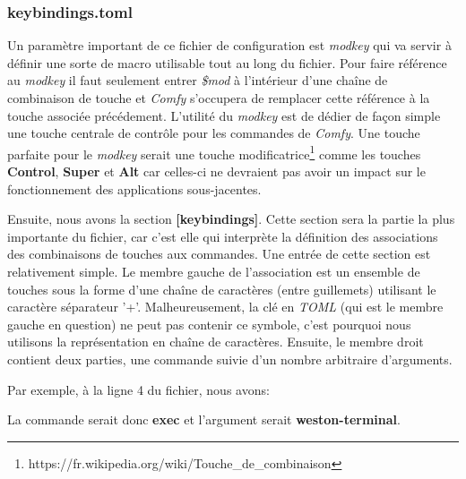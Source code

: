 \documentclass[titlepage]{article}
\begin{document}
\subsubsection{keybindings.toml}
\begin{minipage}{\linewidth}
	
\end{minipage}
\bigskip

\par
Un paramètre important de ce fichier de configuration est \textit{modkey} qui va
servir à définir une sorte de macro utilisable tout au long du fichier. Pour
faire référence au \textit{modkey} il faut seulement entrer \textit{\$mod} à
l'intérieur d'une chaîne de combinaison de touche et \textit{Comfy} s'occupera
de remplacer cette référence à la touche associée précédement. L'utilité du
\textit{modkey} est de dédier de façon simple une touche centrale de contrôle
pour les commandes de \textit{Comfy}. Une touche parfaite pour le
\textit{modkey} serait une touche
modificatrice\footnote{https://fr.wikipedia.org/wiki/Touche\_de\_combinaison}
comme les touches \textbf{Control}, \textbf{Super} et \textbf{Alt} car celles-ci
ne devraient pas avoir un impact sur le fonctionnement des applications
sous-jacentes.
\bigskip

\par
Ensuite, nous avons la section \textbf{[keybindings]}. Cette section sera la
partie la plus importante du fichier, car c'est elle qui interprète la définition
des associations des combinaisons de touches aux commandes. Une entrée de cette
section est relativement simple. Le membre gauche de l'association est un
ensemble de touches sous la forme d'une chaîne de caractères (entre guillemets)
utilisant le caractère séparateur '+'. Malheureusement, la clé en \textit{TOML}
(qui est le membre gauche en question) ne peut pas contenir ce symbole, c'est
pourquoi nous utilisons la représentation en chaîne de caractères. Ensuite, le
membre droit contient deux parties, une commande suivie d'un nombre arbitraire
d'arguments.
\bigskip

\begin{minipage}{\linewidth}
Par exemple, à la ligne 4 du fichier, nous avons:



La commande serait donc \textbf{exec} et l'argument serait \textbf{weston-terminal}.
\end{minipage}
\end{document}
